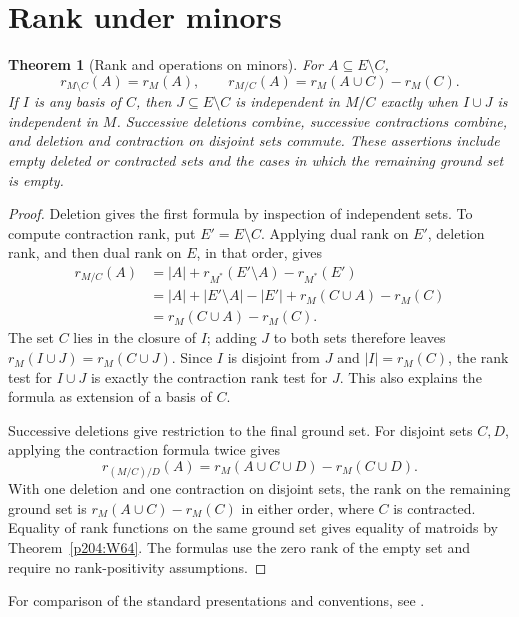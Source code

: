 \documentclass[11pt,oneside,openany]{book}
\theoremstyle{plain}
\newtheorem{theorem}{Theorem}[chapter]
\theoremstyle{definition}
\theoremstyle{remark}
\begin{document}
\section{Rank under minors}

\begin{theorem}[Rank and operations on minors]
\label{p204:W69}
For \(A\subseteq E\setminus C\),
\[
 r_{M\setminus C}(A)=r_M(A),\qquad
 r_{M/C}(A)=r_M(A\cup C)-r_M(C).
\]
If \(I\) is any basis of \(C\), then \(J\subseteq E\setminus C\)
is independent in \(M/C\) exactly when \(I\cup J\) is independent
in \(M\). Successive deletions combine, successive contractions
combine, and deletion and contraction on disjoint sets commute.
These assertions include empty deleted or contracted sets and
the cases in which the remaining ground set is empty.
\end{theorem}

\begin{proof}
Deletion gives the first formula by inspection of independent
sets. To compute contraction rank, put \(E'=E\setminus C\).
Applying dual rank on \(E'\), deletion rank, and then dual
rank on \(E\), in that order, gives
\begin{align*}
 r_{M/C}(A)
 &= |A|+r_{M^*}(E'\setminus A)-r_{M^*}(E')\\
 &= |A|+|E'\setminus A|-|E'|
       +r_M(C\cup A)-r_M(C)\\
 &=r_M(C\cup A)-r_M(C).
\end{align*}
The set \(C\) lies in the closure of \(I\); adding \(J\) to
both sets therefore leaves
\(r_M(I\cup J)=r_M(C\cup J)\). Since \(I\) is disjoint from
\(J\) and \(|I|=r_M(C)\), the rank test for \(I\cup J\) is
exactly the contraction rank test for \(J\). This also
explains the formula as extension of a basis of \(C\).

Successive deletions give restriction to the final ground
set. For disjoint sets \(C,D\), applying the contraction
formula twice gives
\[
 r_{(M/C)/D}(A)=r_M(A\cup C\cup D)-r_M(C\cup D).
\]
With one deletion and one contraction on disjoint sets, the
rank on the remaining ground set is
\(r_M(A\cup C)-r_M(C)\) in either order, where \(C\) is
contracted. Equality of rank functions on the same ground
set gives equality of matroids by Theorem~\ref{p204:W64}.
The formulas use the zero rank of the empty set and
require no rank-positivity assumptions.
\end{proof}

For comparison of the standard presentations and conventions,
see \cite[Sections 1.1--1.4 and Chapters 2--3]{Oxley}.
\end{document}
